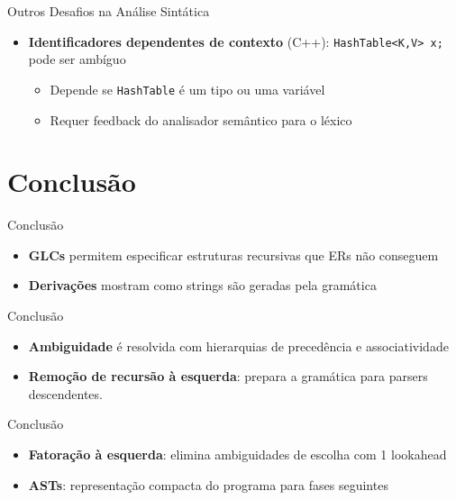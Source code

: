 \begin{frame}[fragile]{Outros Desafios na Análise Sintática}

    \begin{itemize}

        \item
        \textbf{Identificadores dependentes de contexto} (C++):
        \texttt{HashTable<K,V> x;} pode ser ambíguo

        \begin{itemize}

            \item
            Depende se \texttt{HashTable} é um tipo ou uma
            variável
            \item
            Requer feedback do analisador semântico para o léxico
        \end{itemize}
    \end{itemize}
\end{frame}


\section{Conclusão}\label{conclusuxe3o}

\begin{frame}{Conclusão}

    \begin{itemize}

        \item
        \textbf{GLCs} permitem especificar estruturas recursivas que ERs não
        conseguem
        \item
        \textbf{Derivações} mostram como strings são geradas pela gramática
    \end{itemize}
\end{frame}

\begin{frame}{Conclusão}

    \begin{itemize}

        \item
        \textbf{Ambiguidade} é resolvida com hierarquias de precedência e
        associatividade
        \item
        \textbf{Remoção de recursão à esquerda}: prepara a gramática para
        parsers descendentes.
    \end{itemize}
\end{frame}

\begin{frame}{Conclusão}

    \begin{itemize}

        \item
        \textbf{Fatoração à esquerda}: elimina ambiguidades de escolha com 1
        lookahead
        \item
        \textbf{ASTs}: representação compacta do programa para fases seguintes
    \end{itemize}
\end{frame}

